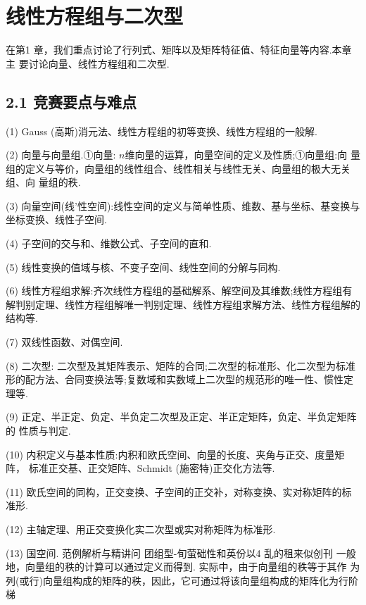 \chapter{线性方程组与二次型}


\hypertarget{source-p101}{}
在第1 章，我们重点讨论了行列式、矩阵以及矩阵特征值、特征向量等内容.本章主
要讨论向量、线性方程组和二次型.
\section*{2.1 竞赛要点与难点}
\par\noindent (1) Gauss (高斯)消元法、线性方程组的初等变换、线性方程组的一般解.
\par\noindent (2) 向量与向量组.{\symbolfont ①}向量: $n$维向量的运算，向量空间的定义及性质;{\symbolfont ①}向量组:向
量组的定义与等价，向量组的线性组合、线性相关与线性无关、向量组的极大无关组、向
量组的秩.
\par\noindent (3) 向量空间(线'性空间):线性空间的定义与简单性质、维数、基与坐标、基变换与
坐标变换、线性子空间.
\par\noindent (4) 子空间的交与和、维数公式、子空间的直和.
\par\noindent (5) 线性变换的值域与核、不变子空间、线性空间的分解与同构.
\par\noindent (6) 线性方程组求解:齐次线性方程组的基础解系、解空间及其维数;线性方程组有
解判别定理、线性方程组解唯一判别定理、线性方程组求解方法、线性方程组解的结构等.
\par\noindent (7) 双线性函数、对偶空间.
\par\noindent (8) 二次型: 二次型及其矩阵表示、矩阵的合同;二次型的标准形、化二次型为标准
形的配方法、合同变换法等;复数域和实数域上二次型的规范形的唯一性、惯性定理等.
\par\noindent (9) 正定、半正定、负定、半负定二次型及正定、半正定矩阵，负定、半负定矩阵的
性质与判定.
\par\noindent (10) 内积定义与基本性质:内积和欧氏空间、向量的长度、夹角与正交、度量矩阵，
标准正交基、正交矩阵、Schmidt (施密特)正交化方法等.
\par\noindent (11) 欧氏空间的同构，正交变换、子空间的正交补，对称变换、实对称矩阵的标准形.
\par\noindent (12) 主轴定理、用正交变换化实二次型或实对称矩阵为标准形.
\par\noindent (13) 国空间.
范例解析与精讲问
团组型-旬萤础性和英份以4 乱的租来似创刊
一般地，向量组的秩的计算可以通过定义而得到. 实际中，由于向量组的秩等于其作
为列(或行)向量组构成的矩阵的秩，因此，它可通过将该向量组构成的矩阵化为行阶梯


